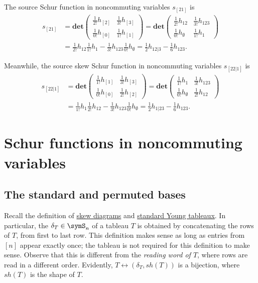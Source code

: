 \begin{example}
The source Schur function in noncommuting variables $s_{[21]}$ is
\begin{align*}
s_{[21]}
&  = {\mathbf{det} \begin{pmatrix}
\frac{1}{2!} h_{[2]}& \frac{1}{3!} h_{[3]}\\
\frac{1}{0!} h_{[0]}& \frac{1}{1!} h_{[1]}
\end{pmatrix}}
= \mathbf{det} \begin{pmatrix}
\frac{1}{2!} h_{12}& \frac{1}{3!} h_{123}\\
\frac{1}{0!} h_{\emptyset}& \frac{1}{1!} h_{1}
\end{pmatrix}\\
&= \frac{1}{2!} h_{12} \frac{1}{1!} h_{1}
- \frac{1}{3!} h_{123}\frac{1}{0!} h_{\emptyset}
= \frac{1}{2} h_{12|3} - \frac{1}{6} h_{123}.
\end{align*}

Meanwhile, the source skew Schur function in noncommuting variables
$s_{[22|1]}$ is
\begin{align*}
s_{[22|1]}
&=  {\mathbf{det} \begin{pmatrix}
\frac{1}{1!} h_{[1]}& \frac{1}{3!} h_{[3]}\\
\frac{1}{0!} h_{[0]}& \frac{1}{2!} h_{[2]}
\end{pmatrix}}
=  \mathbf{det} \begin{pmatrix}
\frac{1}{1!} h_{1}& \frac{1}{3!} h_{123}\\
\frac{1}{0!} h_{\emptyset}& \frac{1}{2!} h_{12}
\end{pmatrix}\\
&= \frac{1}{1!} h_{1}\frac{1}{2!} h_{12}
- \frac{1}{3!} h_{123}\frac{1}{0!} h_{\emptyset}
= \frac{1}{2} h_{1|23} - \frac{1}{6} h_{123}.
\end{align*}
\end{example}




\section[ncSchur]{Schur functions in noncommuting variables}

\subsection[NCSYMBases]{The standard and permuted bases}

Recall the definition of \hyperref[skewShapes]{skew diagrams} and
\hyperref[standardYoungTableau]{standard Young tableaux}.
In particular, the \label{tableauRowPermutation}
$\delta_T \in \symS_n$ of a tableau $T$
is obtained by concatenating the rows of $T$, from first to last row.
This definition makes sense as long as entries from $[n]$ appear exactly once;
the tableau is not required for this definition to make sense.
Observe that this is different from the \emph{reading word of $T$}, where rows
are read in a different order.
Evidently, $T \leftrightarrow (\delta_T, sh(T))$ is a bijection, where $sh(T)$
is the shape of $T$.

